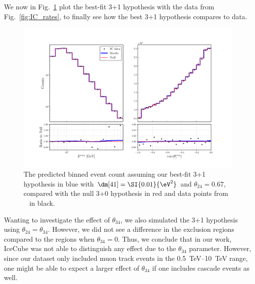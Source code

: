 We now in Fig.~\ref{fig:final_rate_plot} plot the best-fit 3+1 hypothesis with the data from Fig.~\ref{fig:IC_rates}, to finally see how the best 
3+1 hypothesis compares to data.
\begin{figure}
    \centering
    \includegraphics[width=1\textwidth]{figures/final_rate_plot.pdf}
    \caption{The predicted binned event count assuming our best-fit 3+1 hypothesis in blue with $\dm[41] = \SI{0.01}{\eV^2}$ and $\theta_{24} = 0.67$, compared with the 
    null 3+0 hypothesis in red and data points from ~\cite{IC2020} in black.}\label{fig:final_rate_plot}
\end{figure}

Wanting to investigate the effect of $\theta_{34}$, we also simulated the 3+1 hypothesis using $\theta_{24} = \theta_{34}$. However, we did not see 
a difference in the exclusion regions compared to the regions when $\theta_{34} = 0$. Thus, we conclude that in our work, IceCube was not able to 
distinguish any effect due to the $\theta_{34}$ parameter. However, since our dataset only included muon track events in the \SIrange{0.5}{10}{\TeV} range,
one might be able to expect a larger effect of $\theta_{34}$ if one includes cascade events as well.